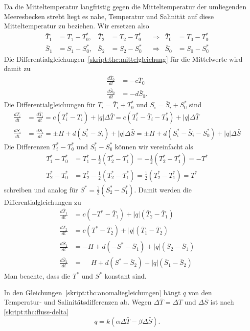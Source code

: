 Da die Mitteltemperatur langfristig gegen die Mitteltemperatur der
umliegenden Meeresbecken strebt liegt es nahe, Temperatur und
Salinität auf diese Mitteltemperatur zu beziehen.
Wir ersetzen also
\begin{equation}
\begin{aligned}
\bar T_1&=T_1-T_0^*,
&
\bar T_2&=T_2-T_0^*
&&\Rightarrow&
\bar T_0&=T_0-T_0^*
\\
\bar S_1&=S_1-S_0^*,
&
\bar S_2&=S_2-S_0^*
&&\Rightarrow&
\bar S_0&=S_0-S_0^*
\end{aligned}
\end{equation}
Die Differentialgleichungen~\eqref{skript:thc:mittelgleichung}
für die Mittelwerte wird damit zu
\begin{align*}
\frac{d\bar T_0}{dt} &= -c \bar T_0\\
\frac{d\bar S_0}{dt} &= -d \bar S_0.
\end{align*}
Die Differentialgleichungen für
$T_i=\bar T_i + T_0^*$
und
$S_i=\bar S_i + S_0^*$
sind
\begin{align*}
\frac{dT_i}{dt}
&=
\frac{d\bar T_i}{dt}
=
c(T_i^*-T_i)
+ |q|\Delta \bar T
=
c(T_i^*- \bar T_i - T_0^*)
+ |q|\Delta \bar T
\\
\frac{dS_i}{dt}
&=
\frac{d\bar S_i}{dt}
=
\pm H
+
d(S_i^*-S_i)
+ |q|\Delta \bar S
=
\pm H
+
d(S_i^*- \bar S_i - S_0^*)
+ |q|\Delta \bar S
\end{align*}
Die Differenzen $T_i^*-T_0^*$ und $S_i^*-S_0^*$ können wir vereinfacht
als
\begin{align*}
T_1^*-T_0^* 
&=
T_1^* - \frac12(T_2^*-T_1^*)
=
-\frac12(T_2^*-T_1^*)
=
-T^*
\\
T_2^*-T_0^*
&=
T_2^*-\frac12(T_2^*-T_1^*)
=
\frac12(T_2^*-T_1^*)
=
T^*
\end{align*}
schreiben und analog für $S^*=\frac12(S_2^*-S_1^*)$.
Damit werden die Differentialgleichungen zu
\begin{equation}
\begin{aligned}
\frac{d\bar T_1}{dt}
&=
c(-T^*-\bar T_1) + |q| (\bar T_2-\bar T_1)
\\
\frac{d\bar T_2}{dt}
&=
c(T^*-\bar T_2) + |q| (\bar T_1-\bar T_2)
\\
\frac{d\bar S_1}{dt}
&=
-H
+
d(-S^*-\bar S_1) + |q|(\bar S_2 - \bar S_1)
\\
\frac{d\bar S_2}{dt}
&=
\phantom{-}H
+
d(S^*-\bar S_2) + |q|(\bar S_1 - \bar S_2)
\end{aligned}
\label{skript:thc:anomaliegleichungen}
\end{equation}
Man beachte, dass die $T^*$ und $S^*$ konstant sind.

In den Gleichungen~\eqref{skript:thc:anomaliegleichungen} hängt
$q$ von den Temperatur- und Salinitätsdifferenzen ab.
Wegen $\Delta\bar T=\Delta T$ und $\Delta\bar S$ ist nach
\eqref{skript:thc:fluss-delta}
\begin{equation}
q = k(\alpha\Delta\bar T-\beta \Delta\bar S).
\label{skript:thc:fluss-delta-anomalie}
\end{equation}





